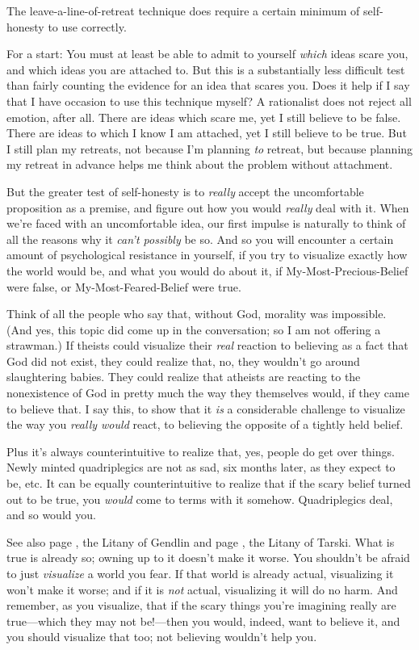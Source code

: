 {
 The leave-a-line-of-retreat technique does require a certain
minimum of self-honesty to use correctly.}

{
 For a start: You must at least be able to admit to yourself
\textit{which} ideas scare you, and which ideas you are attached to.
But this is a substantially less difficult test than fairly counting
the evidence for an idea that scares you. Does it help if I say that I
have occasion to use this technique myself? A rationalist does not
reject all emotion, after all. There are ideas which scare me, yet I
still believe to be false. There are ideas to which I know I am
attached, yet I still believe to be true. But I still plan my retreats,
not because I'm planning \textit{to} retreat, but
because planning my retreat in advance helps me think about the problem
without attachment.}

{
 But the greater test of self-honesty is to \textit{really} accept
the uncomfortable proposition as a premise, and figure out how you
would \textit{really} deal with it. When we're faced
with an uncomfortable idea, our first impulse is naturally to think of
all the reasons why it \textit{can't possibly} be so.
And so you will encounter a certain amount of psychological resistance
in yourself, if you try to visualize exactly how the world would be,
and what you would do about it, if My-Most-Precious-Belief were false,
or My-Most-Feared-Belief were true.}

{
 Think of all the people who say that, without God, morality was
impossible. (And yes, this topic did come up in the conversation; so I
am not offering a strawman.) If theists could visualize their
\textit{real} reaction to believing as a fact that God did not exist,
they could realize that, no, they wouldn't go around
slaughtering babies. They could realize that atheists are reacting to
the nonexistence of God in pretty much the way they themselves would,
if they came to believe that. I say this, to show that it \textit{is} a
considerable challenge to visualize the way you \textit{really would}
react, to believing the opposite of a tightly held belief.}

{
 Plus it's always counterintuitive to realize that,
yes, people do get over things. Newly minted quadriplegics are not as
sad, six months later, as they expect to be, etc. It can be equally
counterintuitive to realize that if the scary belief turned out to be
true, you \textit{would} come to terms with it somehow. Quadriplegics
deal, and so would you.}

{
 See also page \pageref{litany_of_gendlin}, the Litany of Gendlin and page \pageref{litany_of_tarski}, the Litany of Tarski. What is
true is already so; owning up to it doesn't make it
worse. You shouldn't be afraid to just
\textit{visualize} a world you fear. If that world is already actual,
visualizing it won't make it worse; and if it is
\textit{not} actual, visualizing it will do no harm. And remember, as
you visualize, that if the scary things you're
imagining really are true---which they may not be!---then you would,
indeed, want to believe it, and you should visualize that too; not
believing wouldn't help you.}

